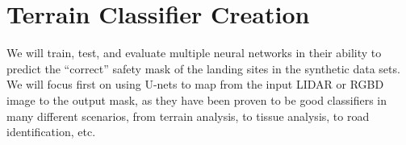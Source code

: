 \section{Terrain Classifier Creation}

We will train, test, and evaluate multiple neural networks in their ability to predict the
``correct'' safety mask of the landing sites in the synthetic data sets.
We will focus first on using U-nets to map from the input LIDAR or RGBD image
to the output mask, as they have been proven to be good classifiers in many different scenarios,
from terrain analysis, to tissue analysis, to road identification, etc.
